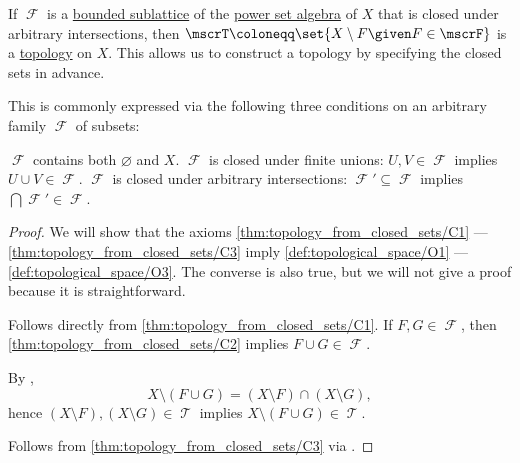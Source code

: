\begin{proposition}\label{thm:topology_from_closed_sets}
  If \( \mscrF \) is a \hyperref[def:lattice/subobject]{bounded sublattice} of the \hyperref[def:power_set_algebra]{power set algebra} of \( X \) that is closed under arbitrary intersections, then \( \mscrT \coloneqq \set{ X \setminus F \given F \in \mscrF } \) is a \hyperref[def:topological_space]{topology} on \( X \). This allows us to construct a topology by specifying the closed sets in advance.

  This is commonly expressed via the following three conditions on an arbitrary family \( \mscrF \) of subsets:
  \begin{thmenum}
     \( \mscrF \) contains both \( \varnothing \) and \( X \).
     \( \mscrF \) is closed under finite unions: \( U, V \in \mscrF \) implies \( U \cup V \in \mscrF \).
     \( \mscrF \) is closed under arbitrary intersections: \( \mscrF' \subseteq \mscrF \) implies \( \bigcap \mscrF' \in \mscrF \).
  \end{thmenum}
\end{proposition}
\begin{proof}
  We will show that the axioms \ref{thm:topology_from_closed_sets/C1} --- \ref{thm:topology_from_closed_sets/C3} imply \ref{def:topological_space/O1} --- \ref{def:topological_space/O3}. The converse is also true, but we will not give a proof because it is straightforward.

   Follows directly from \ref{thm:topology_from_closed_sets/C1}.
   If \( F, G \in \mscrF \), then \ref{thm:topology_from_closed_sets/C2} implies \( F \cup G \in \mscrF \).

  By ,
  \begin{equation*}
    X \setminus (F \cup G) = (X \setminus F) \cap (X \setminus G),
  \end{equation*}
  hence \( (X \setminus F), (X \setminus G) \in \mscrT \) implies \( X \setminus (F \cup G) \in \mscrT \).

   Follows from \ref{thm:topology_from_closed_sets/C3} via .
\end{proof}

